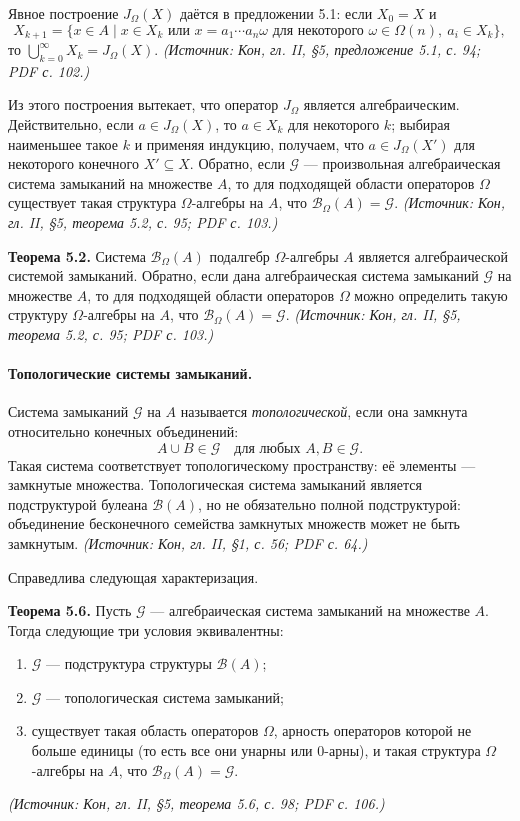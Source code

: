 \documentclass[a4paper,12pt]{article}
\begin{document}
Явное построение \(J_\Omega(X)\) даётся в предложении 5.1: если \(X_0=X\) и
\[
X_{k+1}=\{x\in A\mid x\in X_k\text{ или }x=a_1\cdots a_n\omega\text{ для некоторого }\omega\in\Omega(n),\ a_i\in X_k\},
\]
то \(\bigcup_{k=0}^\infty X_k=J_\Omega(X)\).
\textit{(Источник: Кон, гл. II, §5, предложение 5.1, с. 94; PDF с. 102.)}

Из этого построения вытекает, что оператор \(J_\Omega\) является алгебраическим. Действительно, если \(a\in J_\Omega(X)\), то \(a\in X_k\) для некоторого \(k\); выбирая наименьшее такое \(k\) и применяя индукцию, получаем, что \(a\in J_\Omega(X')\) для некоторого конечного \(X'\subseteq X\). Обратно, если \(\mathcal{G}\) — произвольная алгебраическая система замыканий на множестве \(A\), то для подходящей области операторов \(\Omega\) существует такая структура \(\Omega\)-алгебры на \(A\), что \(\mathcal{B}_\Omega(A)=\mathcal{G}\).
\textit{(Источник: Кон, гл. II, §5, теорема 5.2, с. 95; PDF с. 103.)}

\textbf{Теорема 5.2.} Система \(\mathcal{B}_\Omega(A)\) подалгебр \(\Omega\)-алгебры \(A\) является алгебраической системой замыканий. Обратно, если дана алгебраическая система замыканий \(\mathcal{G}\) на множестве \(A\), то для подходящей области операторов \(\Omega\) можно определить такую структуру \(\Omega\)-алгебры на \(A\), что \(\mathcal{B}_\Omega(A)=\mathcal{G}\).
\textit{(Источник: Кон, гл. II, §5, теорема 5.2, с. 95; PDF с. 103.)}

\paragraph{Топологические системы замыканий.}
Система замыканий \(\mathcal{G}\) на \(A\) называется \emph{топологической}, если она замкнута относительно конечных объединений:
\[
A\cup B\in\mathcal{G}\quad\text{для любых }A,B\in\mathcal{G}.
\]
Такая система соответствует топологическому пространству: её элементы — замкнутые множества. Топологическая система замыканий является подструктурой булеана \(\mathcal{B}(A)\), но не обязательно полной подструктурой: объединение бесконечного семейства замкнутых множеств может не быть замкнутым.
\textit{(Источник: Кон, гл. II, §1, с. 56; PDF с. 64.)}

Справедлива следующая характеризация.

\textbf{Теорема 5.6.} Пусть \(\mathcal{G}\) — алгебраическая система замыканий на множестве \(A\). Тогда следующие три условия эквивалентны:
\begin{enumerate}[label=(\roman*)]
\item \(\mathcal{G}\) — подструктура структуры \(\mathcal{B}(A)\);
\item \(\mathcal{G}\) — топологическая система замыканий;
\item существует такая область операторов \(\Omega\), арность операторов которой не больше единицы (то есть все они унарны или 0-арны), и такая структура \(\Omega\)-алгебры на \(A\), что \(\mathcal{B}_\Omega(A)=\mathcal{G}\).
\end{enumerate}
\textit{(Источник: Кон, гл. II, §5, теорема 5.6, с. 98; PDF с. 106.)}
\end{document}
